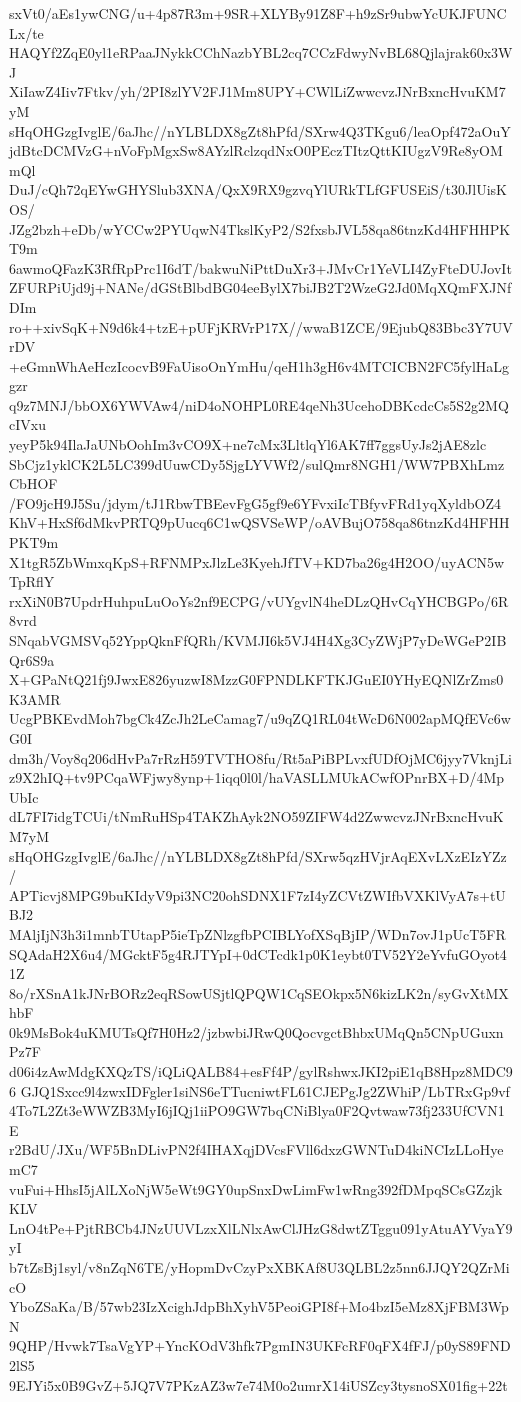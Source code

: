 sxVt0/aEs1ywCNG/u+4p87R3m+9SR+XLYBy91Z8F+h9zSr9ubwYcUKJFUNCLx/te
HAQYf2ZqE0yl1eRPaaJNykkCChNazbYBL2cq7CCzFdwyNvBL68Qjlajrak60x3WJ
XiIawZ4Iiv7Ftkv/yh/2PI8zlYV2FJ1Mm8UPY+CWlLiZwwcvzJNrBxncHvuKM7yM
sHqOHGzgIvglE/6aJhc//nYLBLDX8gZt8hPfd/SXrw4Q3TKgu6/leaOpf472aOuY
jdBtcDCMVzG+nVoFpMgxSw8AYzlRclzqdNxO0PEczTItzQttKIUgzV9Re8yOMmQl
DuJ/cQh72qEYwGHYSlub3XNA/QxX9RX9gzvqYlURkTLfGFUSEiS/t30JlUisKOS/
JZg2bzh+eDb/wYCCw2PYUqwN4TkslKyP2/S2fxsbJVL58qa86tnzKd4HFHHPKT9m
6awmoQFazK3RfRpPrc1I6dT/bakwuNiPttDuXr3+JMvCr1YeVLI4ZyFteDUJovIt
ZFURPiUjd9j+NANe/dGStBlbdBG04eeBylX7biJB2T2WzeG2Jd0MqXQmFXJNfDIm
ro++xivSqK+N9d6k4+tzE+pUFjKRVrP17X//wwaB1ZCE/9EjubQ83Bbc3Y7UVrDV
+eGmnWhAeHczIcocvB9FaUisoOnYmHu/qeH1h3gH6v4MTCICBN2FC5fylHaLggzr
q9z7MNJ/bbOX6YWVAw4/niD4oNOHPL0RE4qeNh3UcehoDBKcdcCs5S2g2MQcIVxu
yeyP5k94IlaJaUNbOohIm3vCO9X+ne7cMx3LltlqYl6AK7ff7ggsUyJs2jAE8zlc
SbCjz1yklCK2L5LC399dUuwCDy5SjgLYVWf2/sulQmr8NGH1/WW7PBXhLmzCbHOF
/FO9jcH9J5Su/jdym/tJ1RbwTBEevFgG5gf9e6YFvxiIcTBfyvFRd1yqXyldbOZ4
KhV+HxSf6dMkvPRTQ9pUucq6C1wQSVSeWP/oAVBujO758qa86tnzKd4HFHHPKT9m
X1tgR5ZbWmxqKpS+RFNMPxJlzLe3KyehJfTV+KD7ba26g4H2OO/uyACN5wTpRflY
rxXiN0B7UpdrHuhpuLuOoYs2nf9ECPG/vUYgvlN4heDLzQHvCqYHCBGPo/6R8vrd
SNqabVGMSVq52YppQknFfQRh/KVMJI6k5VJ4H4Xg3CyZWjP7yDeWGeP2IBQr6S9a
X+GPaNtQ21fj9JwxE826yuzwI8MzzG0FPNDLKFTKJGuEI0YHyEQNlZrZms0K3AMR
UcgPBKEvdMoh7bgCk4ZcJh2LeCamag7/u9qZQ1RL04tWcD6N002apMQfEVc6wG0I
dm3h/Voy8q206dHvPa7rRzH59TVTHO8fu/Rt5aPiBPLvxfUDfOjMC6jyy7VknjLi
z9X2hIQ+tv9PCqaWFjwy8ynp+1iqq0l0l/haVASLLMUkACwfOPnrBX+D/4MpUbIc
dL7FI7idgTCUi/tNmRuHSp4TAKZhAyk2NO59ZIFW4d2ZwwcvzJNrBxncHvuKM7yM
sHqOHGzgIvglE/6aJhc//nYLBLDX8gZt8hPfd/SXrw5qzHVjrAqEXvLXzEIzYZz/
APTicvj8MPG9buKIdyV9pi3NC20ohSDNX1F7zI4yZCVtZWIfbVXKlVyA7s+tUBJ2
MAljIjN3h3i1mnbTUtapP5ieTpZNlzgfbPCIBLYofXSqBjIP/WDn7ovJ1pUcT5FR
SQAdaH2X6u4/MGcktF5g4RJTYpI+0dCTcdk1p0K1eybt0TV52Y2eYvfuGOyot41Z
8o/rXSnA1kJNrBORz2eqRSowUSjtlQPQW1CqSEOkpx5N6kizLK2n/syGvXtMXhbF
0k9MsBok4uKMUTsQf7H0Hz2/jzbwbiJRwQ0QocvgctBhbxUMqQn5CNpUGuxnPz7F
d06i4zAwMdgKXQzTS/iQLiQALB84+esFf4P/gylRshwxJKI2piE1qB8Hpz8MDC96
GJQ1Sxcc9l4zwxIDFgler1siNS6eTTucniwtFL61CJEPgJg2ZWhiP/LbTRxGp9vf
4To7L2Zt3eWWZB3MyI6jIQj1iiPO9GW7bqCNiBlya0F2Qvtwaw73fj233UfCVN1E
r2BdU/JXu/WF5BnDLivPN2f4IHAXqjDVcsFVll6dxzGWNTuD4kiNCIzLLoHyemC7
vuFui+HhsI5jAlLXoNjW5eWt9GY0upSnxDwLimFw1wRng392fDMpqSCsGZzjkKLV
LnO4tPe+PjtRBCb4JNzUUVLzxXlLNlxAwClJHzG8dwtZTggu091yAtuAYVyaY9yI
b7tZsBj1syl/v8nZqN6TE/yHopmDvCzyPxXBKAf8U3QLBL2z5nn6JJQY2QZrMicO
YboZSaKa/B/57wb23IzXcighJdpBhXyhV5PeoiGPI8f+Mo4bzI5eMz8XjFBM3WpN
9QHP/Hvwk7TsaVgYP+YncKOdV3hfk7PgmIN3UKFcRF0qFX4fFJ/p0yS89FND2lS5
9EJYi5x0B9GvZ+5JQ7V7PKzAZ3w7e74M0o2umrX14iUSZcy3tysnoSX01fig+22t

